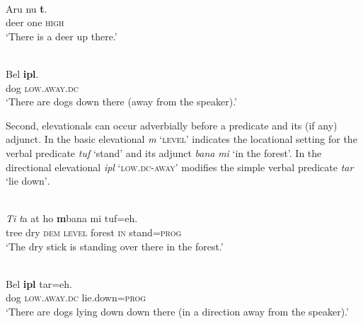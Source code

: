 \ea%
\label{ex:7:22}
 \\
\gll  Aru   nu  \textbf{{t}}\textbf{{{\textopeno}}}\textbf{{{\ng}}}{.}  \\
   deer  one  \textsc{high}   \\
\glt   `There is a deer up there.'
\z









\ea%
\label{ex:7:23}
 \\
\gll  Bel  \textbf{{ipl}}\textbf{{{\textepsilon}}}{.}  \\
  dog  \textsc{low.away.dc}    \\
\glt   `There are dogs down there (away from the speaker).'
\z







Second, elevationals can occur adverbially before a predicate and its (if any) adjunct. In  the basic elevational \textit{m}\textit{{\textopeno}}\textit{{\ng}} `\textsc{level}' indicates the locational setting for the verbal predicate \textit{tuf} `stand' and its adjunct \textit{bana} \textit{mi} `in the forest'. In  the directional elevational \textit{ipl}\textit{{\textepsilon}} \textsc{`low.dc-away'} modifies the simple verbal predicate \textit{tar} `lie down'\textsc{.} 



\ea%
\label{ex:7:24}
 \\
\gll  \textit{Ti} \textit ta {{\textglotstop}}{at}  ho  \textbf{{m}}\textbf{{{\textopeno}}}\textbf{{{\ng}}}{bana}  mi  {tuf=eh.} \\
    tree  dry  \textsc{dem} \textsc {level} forest  \textsc{in} stand=\textsc{prog} \\
\glt   `The dry stick is standing over there in the forest.'
\z









\ea%
\label{ex:7:25}
 \\
\gll   Bel  \textbf{ipl}\textbf{\textepsilon} tar=eh. \\
   dog  \textsc{low.away.dc} lie.down=\textsc{prog}   \\
\glt   `There are dogs lying down down there (in a direction away from the speaker).' 
\z







